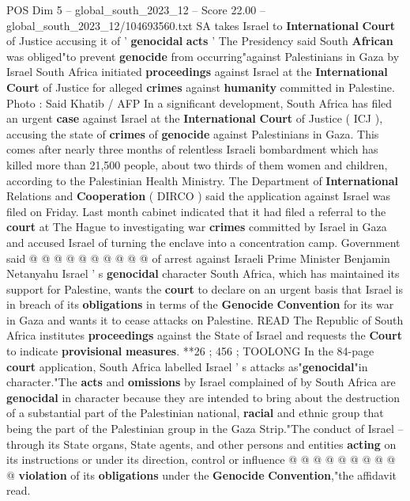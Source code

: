 \begin{textsample}{POS Dim 5 – global\_south\_2023\_12 – Score 22.00 – global\_south\_2023\_12/104693560.txt}  \label{ex:f5_pos_102}
SA takes Israel to \textbf{International} \textbf{Court} of Justice accusing it of ' \textbf{genocidal} \textbf{acts} ' The Presidency said South \textbf{African} was obliged"to prevent \textbf{genocide} from occurring"against Palestinians in Gaza by Israel South Africa initiated \textbf{proceedings} against Israel at the \textbf{International} \textbf{Court} of Justice for alleged \textbf{crimes} against \textbf{humanity} committed in Palestine.
Photo : Said Khatib / AFP In a significant development, South Africa has filed an urgent \textbf{case} against Israel at the \textbf{International} \textbf{Court} of Justice ( ICJ ), accusing the state of \textbf{crimes} of \textbf{genocide} against Palestinians in Gaza.
This comes after nearly three months of relentless Israeli bombardment which has killed more than 21,500 people, about two thirds of them women and children, according to the Palestinian Health Ministry.
The Department of \textbf{International} Relations and \textbf{Cooperation} ( DIRCO ) said the application against Israel was filed on Friday.
Last month cabinet indicated that it had filed a referral to the \textbf{court} at The Hague to investigating war \textbf{crimes} committed by Israel in Gaza and accused Israel of turning the enclave into a concentration camp.
Government said @ @ @ @ @ @ @ @ @ @ of arrest against Israeli Prime Minister Benjamin Netanyahu Israel ' s \textbf{genocidal} character South Africa, which has maintained its support for Palestine, wants the \textbf{court} to declare on an urgent basis that Israel is in breach of its \textbf{obligations} in terms of the \textbf{Genocide} \textbf{Convention} for its war in Gaza and wants it to cease attacks on Palestine.
READ The Republic of South Africa institutes \textbf{proceedings} against the State of Israel and requests the \textbf{Court} to indicate \textbf{provisional} \textbf{measures}. **26 ; 456 ; TOOLONG In the 84-page \textbf{court} application, South Africa labelled Israel ' s attacks as"\textbf{genocidal}"in character."The \textbf{acts} and \textbf{omissions} by Israel complained of by South Africa are \textbf{genocidal} in character because they are intended to bring about the destruction of a substantial part of the Palestinian national, \textbf{racial} and ethnic group that being the part of the Palestinian group in the Gaza Strip."The conduct of Israel -- through its State organs, State agents, and other persons and entities \textbf{acting} on its instructions or under its direction, control or influence @ @ @ @ @ @ @ @ @ @ \textbf{violation} of its \textbf{obligations} under the \textbf{Genocide} \textbf{Convention},"the affidavit read.

\end{textsample}
